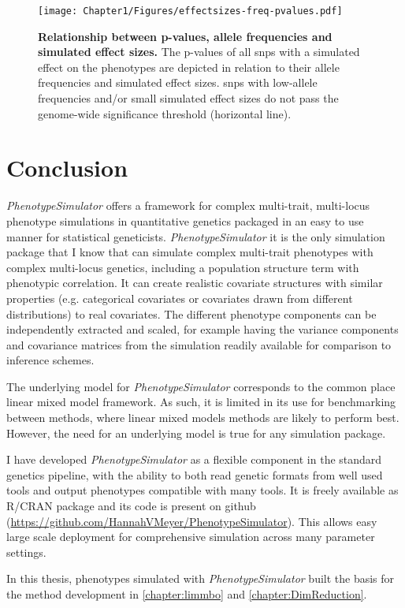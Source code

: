 \begin{figure}[h]
	\centering
	\texttt{[image: Chapter1/Figures/effectsizes-freq-pvalues.pdf]}
	\caption[\textbf{Relationship between p-values, allele frequencies and simulated effect sizes.}]{\textbf{Relationship between p-values, allele frequencies and simulated effect sizes.} The p-values of all \glspl{snp} with a simulated effect on the phenotypes are depicted in relation to their allele frequencies and simulated effect sizes. \glspl{snp} with low-allele frequencies and/or small simulated effect sizes do not pass the genome-wide significance threshold (horizontal line).}
	\label{fig:effect-pvalue-freq}
\end{figure}


\section{Conclusion}
\textit{PhenotypeSimulator} offers a framework for complex multi-trait, multi-locus phenotype simulations in quantitative genetics packaged in an easy to use manner for statistical geneticists.
\textit{PhenotypeSimulator} it is the only simulation package that I know that can simulate complex multi-trait phenotypes with complex multi-locus genetics, including a population structure term with phenotypic correlation. It  can create realistic covariate structures with similar properties (e.g. categorical covariates or covariates drawn from different distributions) to real covariates. The different phenotype components can be independently extracted and scaled, for example having the variance components and covariance matrices from the simulation readily available for comparison to inference schemes. 

The underlying model for \textit{PhenotypeSimulator} corresponds to the common place linear mixed model framework. As such, it is limited in its use for benchmarking between methods, where linear mixed models methods are likely to perform best. However, the need for an underlying model is true for any simulation package.  

I have developed \textit{PhenotypeSimulator} as a flexible component in the standard genetics pipeline, with the ability to both read genetic formats from well used tools and output phenotypes compatible with many tools.  It is freely available as R/CRAN package and its code is present on github (\url{https://github.com/HannahVMeyer/PhenotypeSimulator}). This allows easy large scale deployment for comprehensive simulation across many parameter settings. 

In this thesis, phenotypes simulated with \textit{PhenotypeSimulator} built the basis for the method development in \cref{chapter:limmbo} and \cref{chapter:DimReduction}.